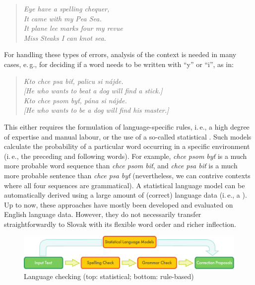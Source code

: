 \begin{multicols}{2}
\begin{verse}
\emph{%
Eye have a spelling chequer,\\
It came with my Pea Sea.\\
It plane lee marks four my revue\\
Miss Steaks I can knot sea.
}
\end{verse}

For handling these types of errors, analysis of the context is needed in many cases, e.\,g., for deciding if a word needs to be written with “y” or “i”, as in:

\begin{verse}
\emph{%
Kto chce psa biť, palicu si nájde.\\
{[}He who wants to beat a dog will find a stick.{]}\\
\smallskip
Kto chce psom byť, pána si nájde.\\
{[}He who wants to be a dog will find his master.{]}
}
\end{verse}

This either requires the formulation of language-specific  rules, i.\,e., a high degree of expertise and manual labour, or the use of a so-called statistical .  Such models calculate the probability of a particular word occurring in a specific environment (i.\,e., the preceding and following words). For example, \emph{chce psom byť} is a much more probable word sequence than \emph{chce psom biť}, and \emph{chce psa biť} is a much more probable sentence than \emph{chce psa byť} (nevertheless, we can contrive contexts where all four sequences are grammatical). A statistical language model can be automatically derived using a large amount of (correct) language data (i.\,e., a ). Up to now, these approaches have mostly been developed and evaluated on English language data. However, they do not necessarily transfer straightforwardly to Slovak with its flexible word order and richer inflection. 

\begin{figure}[htb]
  \center
  \includegraphics[width=\textwidth]{../_media/english/language_checking}
  \caption{Language checking (top: statistical; bottom: rule-based)}
  \label{fig:langcheckingaarch_en}
\end{figure}


\end{multicols}
